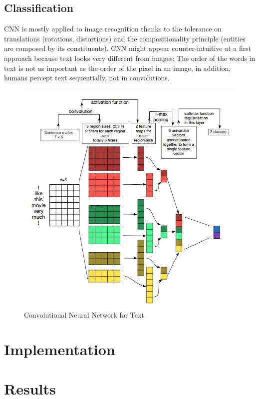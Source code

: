 \documentclass[11pt, oneside]{article}   	%
\begin{document}
\subsection{Classification}

CNN is mostly applied to image recognition thanks to the tolerance on translations (rotations, distortions) and the compositionality principle (entities are composed by its constituents). CNN might appear counter-intuitive at a first approach because text looks very different from images: The order of the words in text is not as important as the order of the pixel in an image, in addition, humans percept text sequentially, not in convolutions.



\begin{figure}[H]
\centering
\includegraphics[width=0.8\linewidth]{TextCNN}
\caption{Convolutional Neural Network for Text}
\label{fig:TextCNN}
\end{figure}


\newpage
\section{Implementation}




\newpage
\section{Results}
\end{document}
